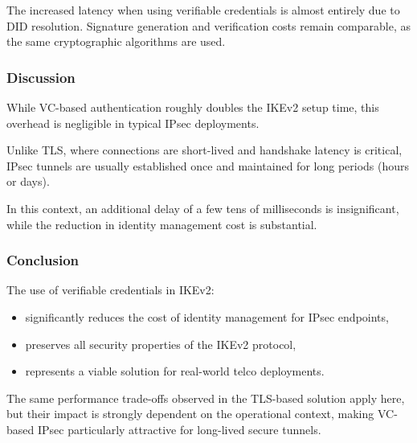 \noindent
The increased latency when using verifiable credentials is almost entirely due to DID resolution.  
Signature generation and verification costs remain comparable, as the same cryptographic algorithms are used.

\subsubsection*{Discussion}

\noindent
While VC-based authentication roughly doubles the IKEv2 setup time, this overhead is negligible in typical IPsec deployments.
\medskip

\noindent
Unlike TLS, where connections are short-lived and handshake latency is critical, IPsec tunnels are usually established once and maintained for long periods (hours or days).
\medskip

\noindent
In this context, an additional delay of a few tens of milliseconds is insignificant, while the reduction in identity management cost is substantial.

\subsubsection*{Conclusion}

\noindent
The use of verifiable credentials in IKEv2:
\begin{itemize}
    \item significantly reduces the cost of identity management for IPsec endpoints,
    \item preserves all security properties of the IKEv2 protocol,
    \item represents a viable solution for real-world telco deployments.
\end{itemize}

\noindent
The same performance trade-offs observed in the TLS-based solution apply here, but their impact is strongly dependent on the operational context, making VC-based IPsec particularly attractive for long-lived secure tunnels.
